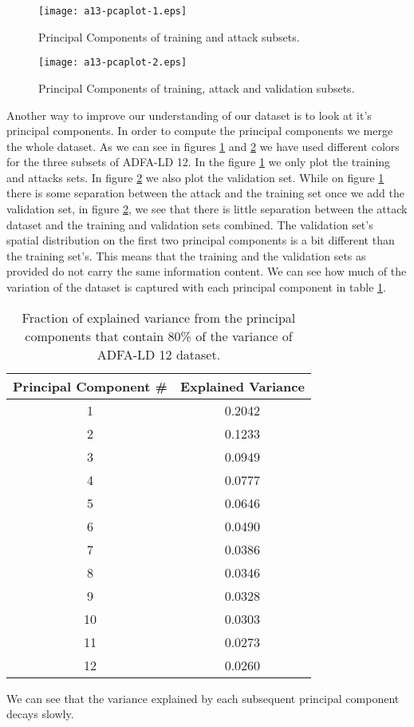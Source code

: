 \documentclass[reqno,openany,12pt]{amsbook}
\begin{document}
\begin{figure}
\texttt{[image: a13-pcaplot-1.eps]}
\caption{Principal Components of training and attack subsets.}
\label{pca1}
\end{figure}
\begin{figure}
\texttt{[image: a13-pcaplot-2.eps]}
\caption{Principal Components of training, attack and validation subsets.}
\label{pca2}
\end{figure}

Another way to improve our understanding of our dataset is to look at it's principal components. In order to compute the principal components we merge the whole dataset. As we can see in figures \ref{pca1} and \ref{pca2} we have used different colors for the three subsets of ADFA-LD 12. In the figure \ref{pca1} we only plot the training and attacks sets. In figure \ref{pca2} we also plot the validation set. While on figure \ref{pca1} there is some separation between the attack and the training set once we add the validation set, in figure \ref{pca2}, we see that there is little separation between the attack dataset and the training and validation sets combined. The validation set's spatial distribution on the first two principal components is a bit different than the training set's.
This means 
that the training and the validation sets as provided do not carry the same information content. We can see how much of the variation of the dataset is captured with each principal component in table \ref{pcat1}.
\begin{table}
\begin{tabular}{|c|c|}
\hline
Principal Component \# &  Explained Variance \\ \hline 
1  & 0.2042 \\ \hline
2  & 0.1233 \\ \hline
3  & 0.0949 \\ \hline
4  & 0.0777 \\ \hline
5  & 0.0646 \\ \hline
6  & 0.0490 \\ \hline
7  & 0.0386 \\ \hline
8  & 0.0346 \\ \hline
9  & 0.0328 \\ \hline
10 & 0.0303 \\ \hline
11 & 0.0273 \\ \hline
12 & 0.0260 \\ \hline
\end{tabular}
\vspace{5pt}
\caption{Fraction of explained variance from the principal components that contain 80\% of the variance of ADFA-LD 12 dataset.}
\label{pcat1}
\end{table}
We can see that the variance explained by each subsequent principal component decays slowly.
\end{document}
